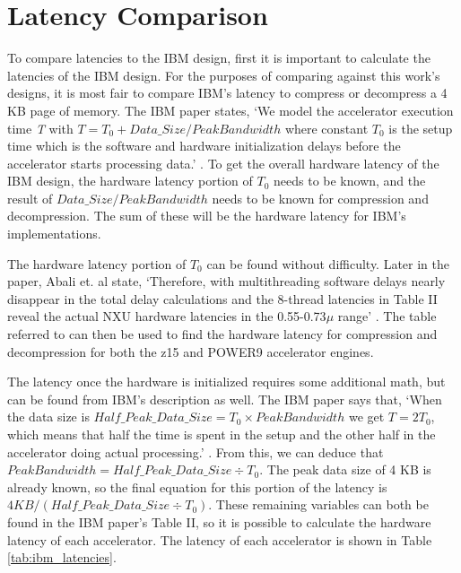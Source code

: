 \documentclass[doublespace,nopageskip]{VTthesis}
\begin{document}
\section{Latency Comparison}\label{se:latency_comparison}
To compare latencies to the IBM design, first it is important to calculate the latencies of the IBM design. For the purposes of comparing against this work's designs, it is most fair to compare IBM's latency to compress or decompress a 4 KB page of memory. The IBM paper states, `We model the accelerator execution time \emph{T} with $T=T_{0}+Data\_Size/PeakBandwidth$ where constant \emph{$T_{0}$} is the setup time which is the software and hardware initialization delays before the accelerator starts processing data.' \cite{ibm}. To get the overall hardware latency of the IBM design, the hardware latency portion of \emph{$T_{0}$} needs to be known, and the result of $Data\_Size/PeakBandwidth$ needs to be known for compression and decompression. The sum of these will be the hardware latency for IBM's implementations.

The hardware latency portion of \emph{$T_{0}$} can be found without difficulty. Later in the paper, Abali et. al state, `Therefore, with multithreading software delays nearly disappear in the total delay calculations and the 8-thread latencies in Table II reveal the actual NXU hardware latencies in the 0.55-0.73\emph{$\mu$} range' \cite{ibm}. The table referred to can then be used to find the hardware latency for compression and decompression for both the z15 and POWER9 accelerator engines.

The latency once the hardware is initialized requires some additional math, but can be found from IBM's description as well. The IBM paper says that, `When the data size is $Half\_Peak\_Data\_Size=T_{0} \times PeakBandwidth$ we get $T=2T_{0}$, which means that half the time is spent in the setup and the other half in the accelerator doing actual processing.' \cite{ibm}. From this, we can deduce that $PeakBandwidth=Half\_Peak\_Data\_Size \div T_{0}$. The peak data size of 4 KB is already known, so the final equation for this portion of the latency is $4KB/(Half\_Peak\_Data\_Size \div T_{0})$. These remaining variables can both be found in the IBM paper's Table II, so it is possible to calculate the hardware latency of each accelerator. The latency of each accelerator is shown in Table \ref{tab:ibm_latencies}.
\end{document}
